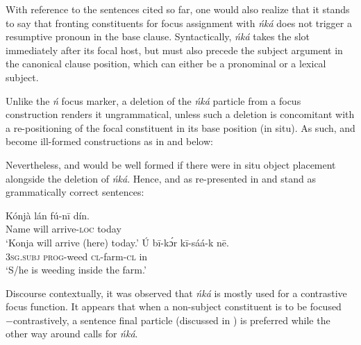 \documentclass[output=paper,colorlinks,citecolor=brown]{langscibook}
\begin{document}
With reference to the sentences cited so far, one would also realize that it stands to say that fronting constituents for focus assignment with \textit{ńká} does not trigger a resumptive pronoun in the base clause. Syntactically, \textit{ńká} takes the slot immediately after its focal host, but must also precede the subject argument in the canonical clause position, which can either be a pronominal or a lexical subject.

Unlike the \textit{ń} focus marker, a deletion of the \textit{ńká} particle from a focus construction renders it ungrammatical, unless such a deletion is concomitant with a re-positioning of the focal constituent in its base position (in situ). As such,  and  become ill-formed constructions as in  and  below:

\ea%
    \label{ex:bisilki:15}
    \z 
\z 

Nevertheless,  and  would be well formed if there were in situ object placement alongside the deletion of \textit{ńká}. Hence,  and  as re-presented in  and  stand as grammatically correct sentences:

\ea%
    \label{ex:bisilki:16}
    \ea\label{ex:bisilki:16a}
    \gll    Kónjà		lán	fú-nī		dín.\\
            Name		will	arrive\textsc{-loc}	today\\
    \glt    ‘Konja will arrive (here) today.’
    \ex\label{ex:bisilki:16b}
    \gll    Ú		bī-kɔ́r 		kī-sáá-k	nē.\\
            \textsc{3sg.subj}	\textsc{prog-}weed 		\textsc{cl-}farm\textsc{-cl}	in\\
    \glt    ‘S/he is weeding inside the farm.’
    \z
\z

Discourse contextually, it was observed that \textit{ńká} is mostly used for a contrastive focus function. It appears that when a non-subject constituent is to be focused −contrastively, a sentence final particle (discussed in ) is preferred while the other way around calls for \textit{ńká}.
\end{document}
